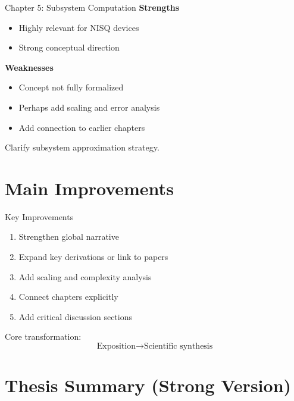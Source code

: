 \documentclass[aspectratio=169]{beamer}
\begin{document}
\begin{frame}{Chapter 5: Subsystem Computation}
\textbf{Strengths}
\begin{itemize}
    \item Highly relevant for NISQ devices
    \item Strong conceptual direction
\end{itemize}

\medskip

\textbf{Weaknesses}
\begin{itemize}
    \item Concept not fully formalized
    \item Perhaps add scaling and error analysis
    \item Add  connection to earlier chapters
\end{itemize}

\medskip



Clarify subsystem approximation strategy.
\end{frame}

\section{Main Improvements}

\begin{frame}{Key Improvements}

\begin{enumerate}
    \item Strengthen global narrative
    \item Expand key derivations or link to papers
    \item Add scaling and complexity analysis
    \item Connect chapters explicitly
    \item Add critical discussion sections
\end{enumerate}

\medskip

Core transformation:
\[
\text{Exposition} \rightarrow \text{Scientific synthesis}
\]
\end{frame}

\section{Thesis Summary (Strong Version)}
\end{document}
